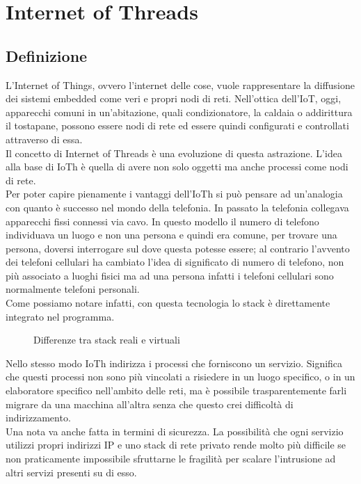 \chapter{Internet of Threads}                %
\lhead[\fancyplain{}{\bfseries\thepage}]{\fancyplain{}{\bfseries\rightmark}}
\section{Definizione}                 %
L'Internet of Things, ovvero l'internet delle cose, vuole rappresentare la diffusione dei sistemi embedded come veri e propri nodi di reti. Nell'ottica dell'IoT, oggi, apparecchi comuni in un'abitazione, quali condizionatore, la caldaia o addirittura il tostapane, possono essere nodi di rete ed essere quindi configurati e controllati attraverso di essa.\\
Il concetto di Internet of Threads \`e una evoluzione di questa astrazione. L'idea alla base di IoTh \`e quella di avere non solo oggetti ma anche processi come nodi di rete.\\
Per poter capire pienamente i vantaggi dell'IoTh si pu\`o pensare ad un'analogia con quanto \`e successo nel mondo della telefonia. In passato la telefonia collegava apparecchi fissi connessi via cavo. In questo modello il numero di telefono individuava un luogo e non una persona e quindi era comune, per trovare una persona, doversi interrogare sul dove questa potesse essere; al contrario l'avvento dei telefoni cellulari ha cambiato l'idea di significato di numero di telefono, non pi\`u associato a luoghi fisici ma ad una persona infatti i telefoni cellulari sono normalmente telefoni personali\cite{K1,K2}.\\
Come possiamo notare infatti, con questa tecnologia lo stack \`e direttamente integrato nel programma.
\begin{figure}[h]
     \begin{center}%
%
    \end{center}
    \caption{%
        Differenze tra stack reali e virtuali
     }%
\end{figure}%
Nello stesso modo IoTh indirizza i processi che forniscono un servizio. Significa che questi processi non sono pi\`u vincolati a risiedere in un luogo specifico, o in un elaboratore specifico nell'ambito delle reti, ma \`e possibile trasparentemente farli migrare da una macchina all'altra senza che questo crei difficolt\`a di indirizzamento.\\
Una nota va anche fatta in termini di sicurezza. La possibilit\`a che ogni servizio utilizzi propri indirizzi IP e uno stack di rete privato rende molto pi\`u difficile se non praticamente impossibile sfruttarne le fragilit\`a per scalare l'intrusione ad altri servizi presenti su di esso.

